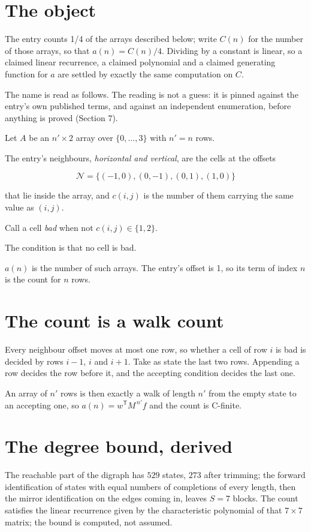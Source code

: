 \documentclass[11pt]{article}
\theoremstyle{definition}
\begin{document}
\section{The object}

The entry counts 1/4 of the arrays described below; write $C(n)$ for the number of those arrays, so that $a(n) = C(n)/4$. Dividing by a constant is linear, so a claimed linear recurrence, a claimed polynomial and a claimed generating function for $a$ are settled by exactly the same computation on $C$.

The name is read as follows. The reading is not a guess: it is pinned against the entry's own published terms, and against an independent enumeration, before anything is proved (Section 7).

Let $A$ be an $n' \times 2$ array over $\{0,\dots,3\}$ with $n' = n$ rows.

The entry's neighbours, {\itshape horizontal and vertical}, are the cells at the offsets

\[\mathcal{N} = \{(-1,0), (0,-1), (0,1), (1,0)\}\]

that lie inside the array, and $c(i,j)$ is the number of them carrying the same value as $(i,j)$.

Call a cell {\itshape bad} when not $c(i,j) \in \{1, 2\}$.

The condition is that no cell is bad.

$a(n)$ is the number of such arrays. The entry's offset is 1, so its term of index $n$ is the count for $n$ rows.

\section{The count is a walk count}

Every neighbour offset moves at most one row, so whether a cell of row $i$ is bad is decided by rows $i-1$, $i$ and $i+1$. Take as state the last two rows. Appending a row decides the row before it, and the accepting condition decides the last one.

An array of $n'$ rows is then exactly a walk of length $n'$ from the empty state to an accepting one, so $a(n) = w^{\mathsf T}M^{\,n'}f$ and the count is C-finite.

\section{The degree bound, derived}

The reachable part of the digraph has $529$ states, $273$ after trimming; the forward identification of states with equal numbers of completions of every length, then the mirror identification on the edges coming in, leaves $S = 7$ blocks. The count satisfies the linear recurrence given by the characteristic polynomial of that $7\times7$ matrix; the bound is computed, not assumed.
\end{document}
